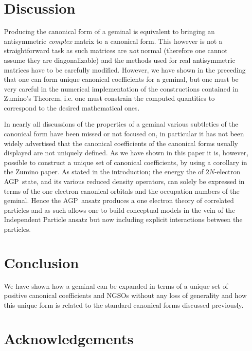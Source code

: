 \documentclass[aps,preprint]{revtex4}%
\begin{document}
\section{Discussion\label{discussion}}

Producing the canonical form of a geminal is equivalent to bringing an
antisymmetric \emph{complex} matrix to a canonical form. This however is not a
straightforward task as such matrices are \emph{not }normal (therefore one
cannot assume they are diagonalizable) and the methods used for real
antisymmetric matrices have to be carefully modified. However, we have shown
in the preceding that one can form unique canonical coefficients for a
geminal, but one must be very careful in the numerical implementation of the
constructions contained in Zumino's Theorem, i.e. one must constrain the
computed quantities to correspond to the desired mathematical ones.

In nearly all discussions of the properties of a geminal various subtleties of
the canonical form have been missed or not focused on, in particular it has
not been widely advertised that the canonical coefficients of the canonical
forms usually displayed are not uniquely defined. As we have shown in this
paper it is, however, possible to construct a unique set of canonical
coefficients, by using a corollary in the Zumino paper. As stated in the
introduction; the energy the of $2N$-electron AGP\ state, and its various
reduced density operators, can solely be expressed in terms of the one
electron canonical orbitals and the occupation numbers of the geminal. Hence
the AGP\ ansatz produces a one electron theory of correlated particles and as
such allows one to build conceptual models in the vein of the Independent
Particle ansatz but now including explicit interactions between the particles.

\section{Conclusion\label{conclusion}}

We have shown how a geminal can be expanded in terms of a unique set of
positive canonical coefficients and NGSOs without any loss of generality and
how this unique form is related to the standard canonical forms discussed previously.

\section{Acknowledgements}
\end{document}
